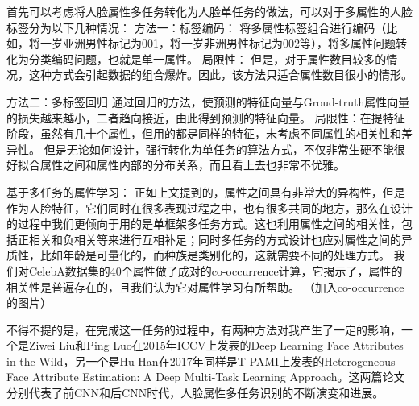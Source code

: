 首先可以考虑将人脸属性多任务转化为人脸单任务的做法，可以对于多属性的人脸标签分为以下几种情况：
方法一：标签编码：
将多属性标签组合进行编码（比如，将一岁亚洲男性标记为001，将一岁非洲男性标记为002等），将多属性问题转化为分类编码问题，也就是单一属性。
局限性：
但是，对于属性数目较多的情况，这种方式会引起数据的组合爆炸。因此，该方法只适合属性数目很小的情形。

方法二：多标签回归
通过回归的方法，使预测的特征向量与Groud-truth属性向量的损失越来越小，二者趋向接近，由此得到预测的特征向量。
局限性：在提特征阶段，虽然有几十个属性，但用的都是同样的特征，未考虑不同属性的相关性和差异性。
但是无论如何设计，强行转化为单任务的算法方式，不仅非常生硬不能很好拟合属性之间和属性内部的分布关系，而且看上去也非常不优雅。

基于多任务的属性学习：
正如上文提到的，属性之间具有非常大的异构性，但是作为人脸特征，它们同时在很多表现过程之中，也有很多共同的地方，那么在设计的过程中我们更倾向于用的是单框架多任务方式。这也利用属性之间的相关性，包括正相关和负相关等来进行互相补足；同时多任务的方式设计也应对属性之间的异质性，比如年龄是可量化的，而种族是类别化的，这就需要不同的处理方式。
我们对CelebA数据集的40个属性做了成对的co-occurrence计算，它揭示了，属性的相关性是普遍存在的，且我们认为它对属性学习有所帮助。
（加入co-occurrence的图片）


不得不提的是，在完成这一任务的过程中，有两种方法对我产生了一定的影响，一个是Ziwei Liu和Ping Luo在2015年ICCV上发表的Deep Learning Face Attributes in the Wild，另一个是Hu Han在2017年同样是T-PAMI上发表的Heterogeneous Face Attribute Estimation: A Deep Multi-Task Learning Approach。这两篇论文分别代表了前CNN和后CNN时代，人脸属性多任务识别的不断演变和进展。

